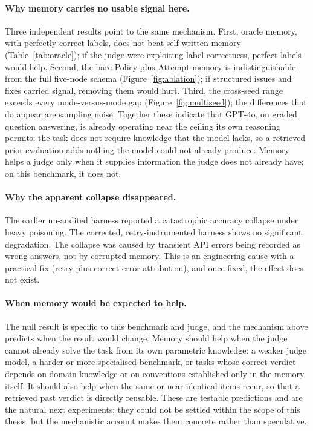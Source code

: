 \documentclass[14pt,a4paper]{extreport}
\begin{document}
\paragraph{Why memory carries no usable signal here.} Three independent results point to the same mechanism. First, oracle memory, with perfectly correct labels, does not beat self-written memory (Table~\ref{tab:oracle}); if the judge were exploiting label correctness, perfect labels would help. Second, the bare Policy-plus-Attempt memory is indistinguishable from the full five-node schema (Figure~\ref{fig:ablation}); if structured issues and fixes carried signal, removing them would hurt. Third, the cross-seed range exceeds every mode-versus-mode gap (Figure~\ref{fig:multiseed}); the differences that do appear are sampling noise. Together these indicate that GPT-4o, on graded question answering, is already operating near the ceiling its own reasoning permits: the task does not require knowledge that the model lacks, so a retrieved prior evaluation adds nothing the model could not already produce. Memory helps a judge only when it supplies information the judge does not already have; on this benchmark, it does not.

\paragraph{Why the apparent collapse disappeared.} The earlier un-audited harness reported a catastrophic accuracy collapse under heavy poisoning. The corrected, retry-instrumented harness shows no significant degradation. The collapse was caused by transient API errors being recorded as wrong answers, not by corrupted memory. This is an engineering cause with a practical fix (retry plus correct error attribution), and once fixed, the effect does not exist.

\paragraph{When memory would be expected to help.} The null result is specific to this benchmark and judge, and the mechanism above predicts when the result would change. Memory should help when the judge cannot already solve the task from its own parametric knowledge: a weaker judge model, a harder or more specialised benchmark, or tasks whose correct verdict depends on domain knowledge or on conventions established only in the memory itself. It should also help when the same or near-identical items recur, so that a retrieved past verdict is directly reusable. These are testable predictions and are the natural next experiments; they could not be settled within the scope of this thesis, but the mechanistic account makes them concrete rather than speculative.
\end{document}
